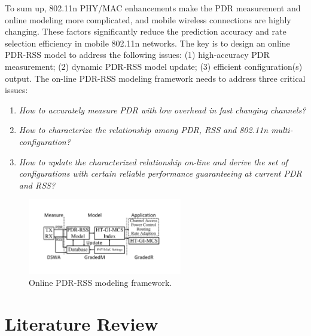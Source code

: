 \documentclass[draftclsnofoot,journal,onecolumn,11pt]{IEEEtran}
\begin{document}
To sum up, 802.11n PHY/MAC enhancements make the PDR measurement and online modeling more complicated, and mobile wireless connections are highly changing. These factors significantly reduce the prediction accuracy and rate selection efficiency in mobile 802.11n networks. The key is to design an online PDR-RSS model to address the following issues: (1) high-accuracy PDR measurement; (2) dynamic PDR-RSS model update; (3) efficient configuration(s) output. The on-line PDR-RSS modeling framework needs to address three critical issues:
\begin{enumerate}
  \item \textit{How to accurately measure PDR with low overhead in fast changing channels?}
  \item \textit{How to characterize the relationship among PDR, RSS and 802.11n multi-configuration?}
  \item \textit{How to update the characterized relationship on-line and derive the set of configurations with certain reliable performance guaranteeing at current PDR and RSS?}
\end{enumerate}

\begin{figure}[!t]
\centering
\includegraphics[width=0.6\textwidth]{modeling.pdf}
\caption{Online PDR-RSS modeling framework.}
\label{onlinemodel}
\end{figure}

\section{Literature Review}
\end{document}
